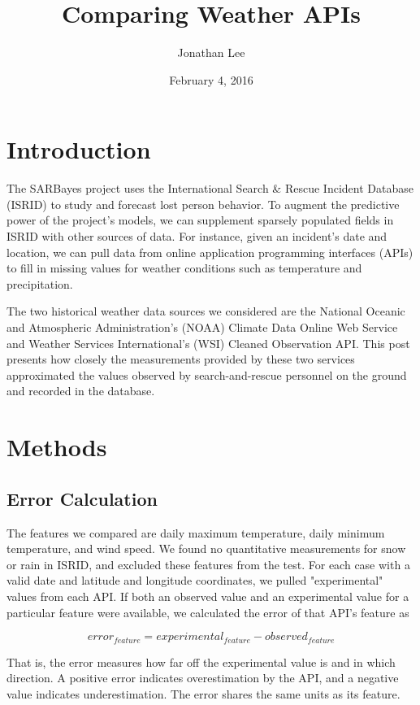 \documentclass[12pt]{article}
\begin{document}
  \title{Comparing Weather APIs}
  \author{Jonathan Lee}
  \date{February 4, 2016}
  \maketitle

  \section{Introduction}
    The SARBayes project uses the International Search \& Rescue Incident
    Database (ISRID) \cite{isrid} to study and forecast lost person behavior.
    To augment the predictive power of the project's models, we can
    supplement sparsely populated fields in ISRID with other sources of data.
    For instance, given an incident's date and location, we can pull data from
    online application programming interfaces (APIs) to fill in missing values
    for weather conditions such as temperature and precipitation.

    The two historical weather data sources we considered are the National
    Oceanic and Atmospheric Administration's (NOAA) Climate Data Online Web
    Service and Weather Services International's (WSI) Cleaned Observation API.
    This post presents how closely the measurements provided by these two
    services approximated the values observed by search-and-rescue personnel on
    the ground and recorded in the database.

  \section{Methods}
    \subsection{Error Calculation}
      The features we compared are daily maximum temperature, daily minimum
      temperature, and wind speed. We found no quantitative measurements for
      snow or rain in ISRID, and excluded these features from the test. For
      each case with a valid date and latitude and longitude coordinates, we
      pulled "experimental" values from each API. If both an observed value and
      an experimental value for a particular feature were available, we
      calculated the error of that API's feature as

      \[error_{feature} = experimental_{feature} - observed_{feature}\]

      That is, the error measures how far off the experimental value is and in
      which direction. A positive error indicates overestimation by the API,
      and a negative value indicates underestimation. The error shares the same
      units as its feature.
\end{document}
